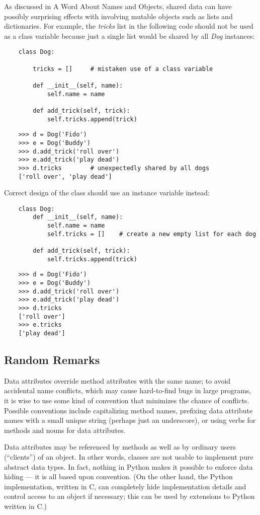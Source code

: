 \documentclass[UTF8]{article}
\begin{document}
As discussed in A Word About Names and Objects, shared data can have possibly surprising effects
with involving mutable objects such as lists and dictionaries. For example, the \emph{tricks} list
in the following code should not be used as a class variable because just a single list would be
shared by all \emph{Dog} instances:
\begin{verbatim}
    class Dog:

        tricks = []     # mistaken use of a class variable

        def __init__(self, name):
            self.name = name

        def add_trick(self, trick):
            self.tricks.append(trick)
\end{verbatim}
\begin{verbatim}
    >>> d = Dog('Fido')
    >>> e = Dog('Buddy')
    >>> d.add_trick('roll over')
    >>> e.add_trick('play dead')
    >>> d.tricks        # unexpectedly shared by all dogs
    ['roll over', 'play dead']
\end{verbatim}

Correct design of the class should use an instance variable instead:
\begin{verbatim}
    class Dog:
        def __init__(self, name):
            self.name = name
            self.tricks = []    # create a new empty list for each dog

        def add_trick(self, trick):
            self.tricks.append(trick)
\end{verbatim}
\begin{verbatim}
    >>> d = Dog('Fido')
    >>> e = Dog('Buddy')
    >>> d.add_trick('roll over')
    >>> e.add_trick('play dead')
    >>> d.tricks
    ['roll over']
    >>> e.tricks
    ['play dead']
\end{verbatim}

\subsection{Random Remarks}
Data attributes override method attributes with the same name; to avoid accidental name conflicts,
which may cause hard-to-find bugs in large programs, it is wise to use some kind of convention that
minimizes the chance of conflicts. Possible conventions include capitalizing method names,
prefixing data attribute names with a small unique string (perhaps just an underscore), or using
verbs for methods and nouns for data attributes.

Data attributes may be referenced by methods as well as by ordinary users (``clients'') of an
object. In other words, classes are not usable to implement pure abstract data types. In fact,
nothing in Python makes it possible to enforce data hiding --- it is all based upon convention. (On
the other hand, the Python implementation, written in C, can completely hide implementation details
and control access to an object if necessary; this can be used by extensions to Python written in
C.)
\end{document}
